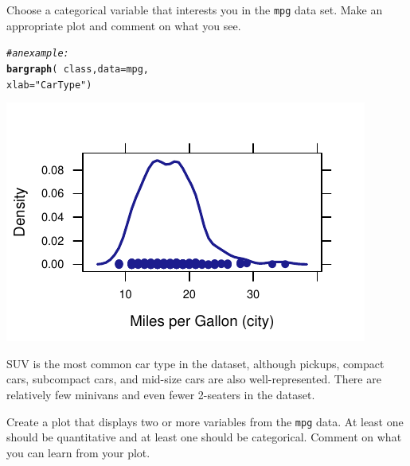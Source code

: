 \documentclass[twoside]{book}\usepackage[]{graphicx}\usepackage[]{xcolor}
\makeatletter
\def\maxwidth{ %
  \ifdim\Gin@nat@width>\linewidth
    \linewidth
  \else
    \Gin@nat@width
  \fi
}
\newcommand{\hlstr}[1]{\textcolor[rgb]{0.192,0.494,0.8}{#1}}%
\newcommand{\hlcom}[1]{\textcolor[rgb]{0.678,0.584,0.686}{\textit{#1}}}%
\newcommand{\hlopt}[1]{\textcolor[rgb]{0,0,0}{#1}}%
\newcommand{\hlstd}[1]{\textcolor[rgb]{0.345,0.345,0.345}{#1}}%
\newcommand{\hlkwc}[1]{\textcolor[rgb]{0.333,0.667,0.333}{#1}}%
\newcommand{\hlkwd}[1]{\textcolor[rgb]{0.737,0.353,0.396}{\textbf{#1}}}%
\newenvironment{kframe}{%
 \def\at@end@of@kframe{}%
 \ifinner\ifhmode%
  \def\at@end@of@kframe{\end{minipage}}%
  \begin{minipage}{\columnwidth}%
 \fi\fi%
 \def\FrameCommand##1{\hskip\@totalleftmargin \hskip-\fboxsep
 \colorbox{shadecolor}{##1}\hskip-\fboxsep
     \hskip-\linewidth \hskip-\@totalleftmargin \hskip\columnwidth}%
 \MakeFramed {\advance\hsize-\width
   \@totalleftmargin\z@ \linewidth\hsize
   \@setminipage}}%
 {\par\unskip\endMakeFramed%
 \at@end@of@kframe}
\newenvironment{knitrout}{}{} %
\newcommand{\Rindex}[1]{\index{\texttt{#1}}}
\newcommand{\dataframe}[1]{{\color{blue!80!black}\texttt{#1}}\Rindex{#1}}
\newcounter{example}[section]
\makeatother
\begin{document}
\begin{problem}
	Choose a categorical variable that interests you in the \dataframe{mpg}
	data set.  Make an appropriate plot and comment on what you see.
\end{problem}
\begin{solution}
\begin{knitrout}
\color{fgcolor}\begin{kframe}
\begin{alltt}
\hlcom{#an example:}
\hlkwd{bargraph}\hlstd{(}\hlopt{~} \hlstd{class ,} \hlkwc{data}\hlstd{=mpg,}
          \hlkwc{xlab}\hlstd{=}\hlstr{"Car Type"}\hlstd{)}
\end{alltt}
\end{kframe}

{\centering \includegraphics[width=\maxwidth]{figures/fig-unnamed-chunk-26-1} 

}



\end{knitrout}
SUV is the most common car type in the dataset, although pickups, compact cars, subcompact cars, and mid-size cars are also well-represented.  There are relatively few minivans and even fewer 2-seaters in the dataset.
\end{solution}

\begin{problem}
	Create a plot that displays two or more variables from the 
	\dataframe{mpg} data.  At least one should be quantitative 
	and at least one should be categorical.
	Comment on what you can learn from your plot.
\end{problem}
\end{document}
